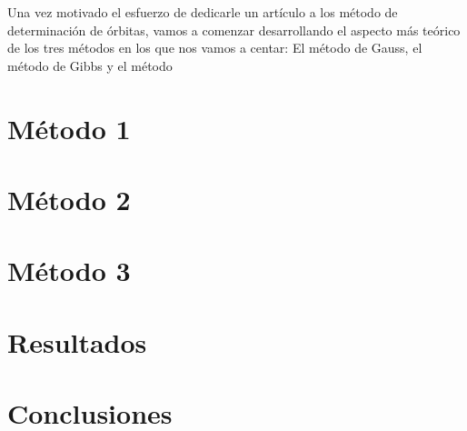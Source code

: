 \documentclass{article}
\numberwithin{equation}{section}
\begin{document}
Una vez motivado el esfuerzo de dedicarle un artículo a los 
método de determinación de órbitas, vamos a comenzar desarrollando 
el aspecto más teórico de los tres métodos en los que nos 
vamos a centar: El método de Gauss, el método de Gibbs y 
el método %
\section{Método 1}
\section{Método 2}
\section{Método 3} %
\section{Resultados} %
\section{Conclusiones} %
\end{document}
